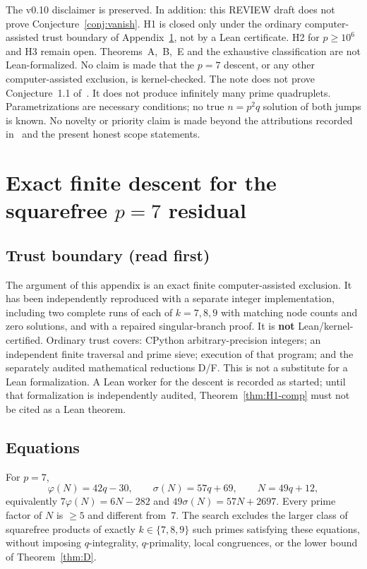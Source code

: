 \documentclass[11pt,reqno]{amsart}
\newcommand{\ph}{\varphi}
\newcommand{\sig}{\sigma}
\theoremstyle{definition}
\begin{document}
The v0.10 disclaimer is preserved. In addition: this REVIEW draft does not prove Conjecture~\ref{conj:vanish}. H1 is closed only under the ordinary computer-assisted trust boundary of Appendix~\ref{app:p7}, not by a Lean certificate. H2 for \(p\ge 10^6\) and H3 remain open. Theorems~A,~B,~E and the exhaustive classification are not Lean-formalized. No claim is made that the \(p=7\) descent, or any other computer-assisted exclusion, is kernel-checked. The note does not prove Conjecture~1.1 of~\cite{RCW2026}. It does not produce infinitely many prime quadruplets. Parametrizations are necessary conditions; no true \(n=p^2q\) solution of both jumps is known. No novelty or priority claim is made beyond the attributions recorded in~\cite{RCW2026} and the present honest scope statements.

\appendix

\section{Exact finite descent for the squarefree \(p=7\) residual}
\label{app:p7}

\subsection*{Trust boundary (read first)}
The argument of this appendix is an exact finite computer-assisted exclusion. It has been independently reproduced with a separate integer implementation, including two complete runs of each of \(k=7,8,9\) with matching node counts and zero solutions, and with a repaired singular-branch proof. It is \textbf{not} Lean/kernel-certified. Ordinary trust covers: CPython arbitrary-precision integers; an independent finite traversal and prime sieve; execution of that program; and the separately audited mathematical reductions D/F. This is not a substitute for a Lean formalization. A Lean worker for the descent is recorded as started; until that formalization is independently audited, Theorem~\ref{thm:H1-comp} must not be cited as a Lean theorem.

\subsection*{Equations}
For \(p=7\),
\[
\ph(N)=42q-30,\qquad \sig(N)=57q+69,\qquad N=49q+12,
\]
equivalently \(7\ph(N)=6N-282\) and \(49\sig(N)=57N+2697\). Every prime factor of \(N\) is \(\ge 5\) and different from~7. The search excludes the larger class of squarefree products of exactly \(k\in\{7,8,9\}\) such primes satisfying these equations, without imposing \(q\)-integrality, \(q\)-primality, local congruences, or the lower bound of Theorem~\ref{thm:D}.
\end{document}
